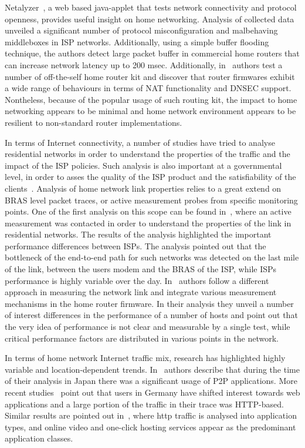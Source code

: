 Netalyzer~\cite{Kreibich10}, a web based java-applet that tests network
connectivity and protocol openness, provides useful insight on home networking.
Analysis of collected data unveiled a significant number of protocol
misconfiguration and malbehaving middleboxes in ISP networks. Additionally,
using a simple buffer flooding technique, the authors detect large packet buffer
in commercial home routers that can increase network latency up to 200 msec.
Additionally, in~\cite{Hatonen10} authors test a number of off-the-self home
router kit and discover that router firmwares exhibit a wide range of behaviours
in terms of NAT functionality and DNSEC support. Nontheless, because of the
popular usage of such routing kit, the impact to home networking appears to be
minimal and home network environment appears to be resilient to non-standard
router implementations. 

In terms of Internet connectivity, a number of studies have tried to analyse
residential networks in order to understand the properties of the traffic and
the impact of the ISP policies. Such analysis is also important at a
governmental level, in order to asses the quality of the ISP product and the
satisfiability of the clients~\cite{fcc, ofcomm}. Analysis of home network link
properties relies to a great extend  on BRAS level packet traces, or active
measurement probes from specific monitoring points. One of the first analysis on
this scope can be found in~\cite{Dischinger2007}, where an active measurement was
contacted in order to understand the properties of the link in residential
networks. The results of the analysis highlighted the important performance
differences between ISPs. The analysis pointed out that the bottleneck of the
end-to-end path for such networks was detected on the last mile of the link,
between the users modem and the BRAS of the ISP, while ISPs performance is
highly variable over the day. In~\cite{Sundaresan2011} authors follow a
different approach in measuring the network link and integrate various
measurement mechanisms in the home router firmware. In their analysis they
unveil a number of interest differences in the performance of a number of hosts
and point out that the very idea of performance is not clear and measurable by a
single test, while critical performance factors are distributed in various
points in the network.  

In terms of home network Internet traffic mix, research has highlighted highly
variable and location-dependent trends. In~\cite{Cho2006} authors describe that
during the time of their analysis in Japan there was a significant usage of P2P
applications. More recent studies~\cite{Maier2009} point out that users in
Germany have shifted interest towards web applications and a large portion of
the traffic in their trace was HTTP-based. Similar results are pointed out
in~\cite{Erman2011}, where http traffic is analysed into application types, and
online video and one-click hosting services appear as the predominant
application classes. 

